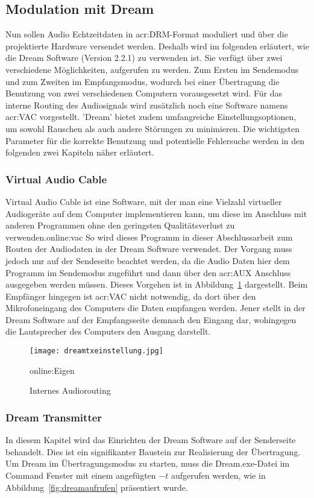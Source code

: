 \subsection{Modulation mit Dream}
\label{subsec:dream}
Nun sollen Audio Echtzeitdaten in \gls{acr:DRM}-Format moduliert und über die projektierte Hardware versendet werden. Deshalb wird im folgenden erläutert, wie die Dream Software (Version 2.2.1) zu verwenden ist. Sie verfügt über zwei verschiedene Möglichkeiten, aufgerufen zu werden. Zum Ersten im Sendemodus und zum Zweiten im Empfangsmodus, wodurch bei einer Übertragung die Benutzung von zwei verschiedenen Computern vorausgesetzt wird. Für das interne Routing des Audiosignals wird zusätzlich noch eine Software namens \gls{acr:VAC} vorgestellt. 'Dream' bietet zudem umfangreiche Einstellungsoptionen, um sowohl Rauschen als auch andere Störungen zu minimieren. Die wichtigsten Parameter für die korrekte Benutzung und potentielle Fehlersuche werden in den folgenden zwei Kapiteln näher erläutert.

\subsubsection{Virtual Audio Cable}
\label{subsubsec:routing}
Virtual Audio Cable ist eine Software, mit der man eine Vielzahl virtueller Audiogeräte auf dem Computer implementieren kann, um diese im Anschluss mit anderen Programmen ohne den geringsten Qualitätsverlust zu verwenden.\gls{online:vac} So wird dieses Programm in dieser Abschlussarbeit zum Routen der Audiodaten in der Dream Software verwendet. Der Vorgang muss jedoch nur auf der Sendeseite beachtet werden, da die Audio Daten hier dem Programm im Sendemodus zugeführt und dann über den \gls{acr:AUX} Anschluss ausgegeben werden müssen. Dieses Vorgehen ist in Abbildung~\ref{fig:dreamtxeinstellung} dargestellt. Beim Empfänger hingegen ist \gls{acr:VAC} nicht notwendig, da dort über den Mikrofoneingang des Computers die Daten empfangen werden. Jener stellt in der Dream Software auf der Empfangsseite demnach den Eingang dar, wohingegen die Lautsprecher des Computers den Ausgang darstellt.

\begin{figure}[H]
	\centering
	\texttt{[image: dreamtxeinstellung.jpg]}
	\caption[Internes Audiorouting]{Internes Audiorouting} \gls{online:Eigen}
	\label{fig:dreamtxeinstellung}
\end{figure}


\subsubsection{Dream Transmitter}
\label{subsubsec:dreamtx}
In diesem Kapitel wird das Einrichten der Dream Software auf der Senderseite behandelt. Dies ist ein signifikanter Baustein zur Realisierung der Übertragung. Um Dream im Übertragungsmodus zu starten, muss die Dream.exe-Datei im Command Fenster mit einem angefügten $-t$ aufgerufen werden, wie in Abbildung~\ref{fig:dreamaufrufen} präsentiert wurde.

